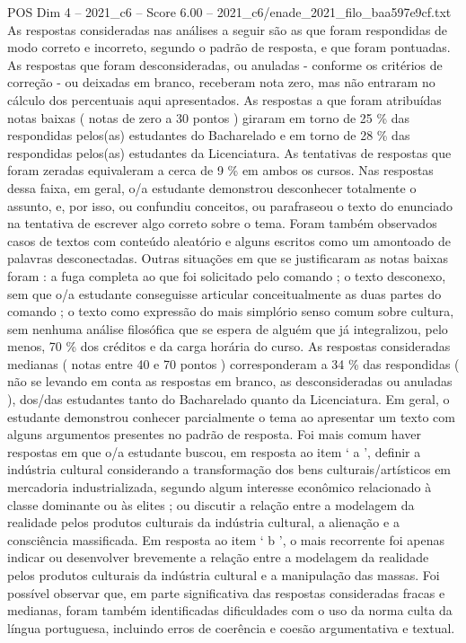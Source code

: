 \begin{textsample}{POS Dim 4 – 2021\_c6 – Score 6.00 – 2021\_c6/enade\_2021\_filo\_baa597e9cf.txt}
As respostas consideradas nas análises a seguir são as que foram respondidas de modo correto e incorreto, segundo o padrão de resposta, e que foram pontuadas.
As respostas que foram desconsideradas, ou anuladas - conforme os critérios de correção - ou deixadas em branco, receberam nota zero, mas não entraram no cálculo dos percentuais aqui apresentados.
As respostas a que foram atribuídas notas baixas ( notas de zero a 30 pontos ) giraram em torno de 25 \% das respondidas pelos(as) estudantes do Bacharelado e em torno de 28 \% das respondidas pelos(as) estudantes da Licenciatura.
As tentativas de respostas que foram zeradas equivaleram a cerca de 9 \% em ambos os cursos.
Nas respostas dessa faixa, em geral, o/a estudante demonstrou desconhecer totalmente o assunto, e, por isso, ou confundiu conceitos, ou parafraseou o texto do enunciado na tentativa de escrever algo correto sobre o tema.
Foram também observados casos de textos com conteúdo aleatório e alguns escritos como um amontoado de palavras desconectadas.
Outras situações em que se justificaram as notas baixas foram : a fuga completa ao que foi solicitado pelo comando ; o texto desconexo, sem que o/a estudante conseguisse articular conceitualmente as duas partes do comando ; o texto como expressão do mais simplório senso comum sobre cultura, sem nenhuma análise filosófica que se espera de alguém que já integralizou, pelo menos, 70 \% dos créditos e da carga horária do curso.
As respostas consideradas medianas ( notas entre 40 e 70 pontos ) corresponderam a 34 \% das respondidas ( não se levando em conta as respostas em branco, as desconsideradas ou anuladas ), dos/das estudantes tanto do Bacharelado quanto da Licenciatura.
Em geral, o estudante demonstrou conhecer parcialmente o tema ao apresentar um texto com alguns argumentos presentes no padrão de resposta.
Foi mais comum haver respostas em que o/a estudante buscou, em resposta ao item ‘ a ’, definir a indústria cultural considerando a transformação dos bens culturais/artísticos em mercadoria industrializada, segundo algum interesse econômico relacionado à classe dominante ou às elites ; ou discutir a relação entre a modelagem da realidade pelos produtos culturais da indústria cultural, a alienação e a consciência massificada.
Em resposta ao item ‘ b ’, o mais recorrente foi apenas indicar ou desenvolver brevemente a relação entre a modelagem da realidade pelos produtos culturais da indústria cultural e a manipulação das massas.
Foi possível observar que, em parte significativa das respostas consideradas fracas e medianas, foram também identificadas dificuldades com o uso da norma culta da língua portuguesa, incluindo erros de coerência e coesão argumentativa e textual.

\end{textsample}
